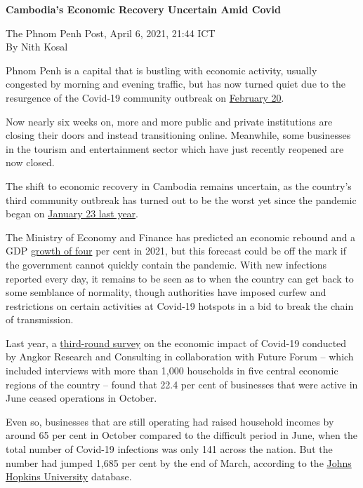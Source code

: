 \documentclass[10pt,a4paper]{letter}
\begin{document}
	
{\Large 
	\textbf{Cambodia's Economic Recovery Uncertain Amid Covid}
} 

The Phnom Penh Post, April 6, 2021, 21:44 ICT \\
By Nith Kosal

Phnom Penh is a capital that is bustling with economic activity, usually congested by morning and evening traffic, but has now turned quiet due to the resurgence of the Covid-19 community outbreak on \href{https://www.channelnewsasia.com/news/asia/cambodia-covid-19-outbreak-chinese-expat-community-china-hun-sen-14242700}{February 20}.

Now nearly six weeks on, more and more public and private institutions are closing their doors and instead transitioning online. Meanwhile, some businesses in the tourism and entertainment sector which have just recently reopened are now closed.

The shift to economic recovery in Cambodia remains uncertain, as the country's third community outbreak has turned out to be the worst yet since the pandemic began on \href{https://www.nytimes.com/2021/02/16/health/coronavirus-pandemic-cambodia-manning.html?referringSource=articleShare}{January 23 last year}.

The Ministry of Economy and Finance has predicted an economic rebound and a GDP \href{https://www.khmertimeskh.com/50826489/mixed-outlook-on-the-economy/}{growth of four} per cent in 2021, but this forecast could be off the mark if the government cannot quickly contain the pandemic. With new infections reported every day, it remains to be seen as to when the country can get back to some semblance of normality, though authorities have imposed curfew and restrictions on certain activities at Covid-19 hotspots in a bid to break the chain of transmission.

Last year, a \href{http://www.angkorresearch.com/imgs/file/The%20Effect%20of%20Covid-19%20Impacts%20on%20Cambodian%20Development_%20Headline%20Results%20Brief_R3_EN_V4.pdf}{third-round survey} on the economic impact of Covid-19 conducted by Angkor Research and Consulting in collaboration with Future Forum -- which included interviews with more than 1,000 households in five central economic regions of the country -- found that 22.4 per cent of businesses that were active in June ceased operations in October.

Even so, businesses that are still operating had raised household incomes by around 65 per cent in October compared to the difficult period in June, when the total number of Covid-19 infections was only 141 across the nation. But the number had jumped 1,685 per cent by the end of March, according to the \href{https://github.com/CSSEGISandData/COVID-19}{Johns Hopkins University} database.
\end{document}
